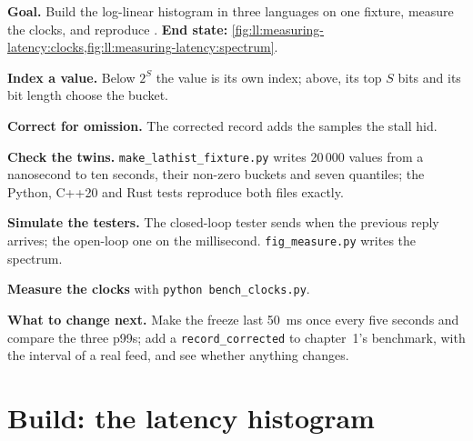 \begin{tutorial}
\textbf{Goal.} Build the log-linear histogram in three languages on one fixture, measure the clocks, and reproduce
. \textbf{End state:} \cref{fig:ll:measuring-latency:clocks,fig:ll:measuring-latency:spectrum}.
\begin{tutsteps}
\item \textbf{Index a value.} Below $2^S$ the value is its own index; above, its top $S$ bits and its bit length choose the
bucket.
\label{lst:ll:measuring-latency:index}
\item \textbf{Correct for omission.} The corrected record adds the samples the stall hid.
\label{lst:ll:measuring-latency:corrected}
\item \textbf{Check the twins.} \texttt{make\_lathist\_fixture.py} writes 20\,000 values from a nanosecond to ten seconds,
their non-zero buckets and seven quantiles; the Python, C++20 and Rust tests reproduce both files exactly.
\item \textbf{Simulate the testers.} The closed-loop tester sends when the previous reply arrives; the open-loop one on the
millisecond. \texttt{fig\_measure.py} writes the spectrum.
\label{lst:ll:measuring-latency:closed}
\item \textbf{Measure the clocks} with \texttt{python bench\_clocks.py}.
\end{tutsteps}
\textbf{What to change next.} Make the freeze last \qty{50}{\milli\second} once every five seconds and compare the three
p99s; add a \texttt{record\_corrected} to chapter~1's benchmark, with the interval of a real feed, and see whether anything
changes.
\end{tutorial}

\section{Build: the latency histogram}\label{bld:ll:measuring-latency:lathist}

